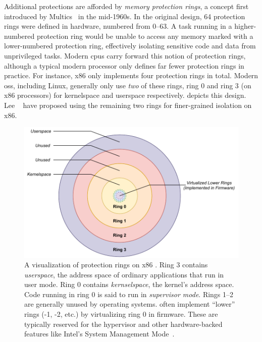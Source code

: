 Additional protections are afforded by \textit{memory protection rings}, a concept first
introduced by Multics~\cite{vyssotsky1965_multics, corbato1965_multics} in the mid-1960s.
In the original design, 64 protection rings were defined in hardware, numbered from 0--63.
A task running in a higher-numbered protection ring would be unable to access any memory
marked with a lower-numbered protection ring, effectively isolating sensitive code and
data from unprivileged tasks. Modern \glspl{cpu} carry forward this notion of protection
rings, although a typical modern processor only defines far fewer protection rings in
practice. For instance, x86 only implements four protection rings in total. Modern
\gls{os}s, including Linux, generally only use \textit{two} of these rings, ring 0 and
ring 3 (on x86 processors) for kernelspace and userspace respectively.  
depicts this design. Lee \etal~\cite{lee2018_lotr} have proposed using the remaining two
rings for finer-grained isolation on x86.

\begin{figure}[htbp]
  \centering
  \includegraphics[width=0.8\linewidth]{figs/background/rings.pdf}
  \caption[Protection rings on modern ]{
    A visualization of protection rings on x86 . Ring 3 contains
    \textit{userspace}, the address space of ordinary applications that run in user mode.
    Ring 0 contains \textit{kernselspace}, the kernel's address space. Code running in
    ring 0 is said to run in \textit{supervisor mode}. Rings 1--2 are generally unused by
     operating systems.  often implement \enquote{lower}
    rings (-1, -2, etc.) by virtualizing ring 0 in firmware. These are typically reserved
    for the hypervisor and other hardware-backed features like Intel's System Management
    Mode~\cite{tereshkin2009_introducing}.
  }%
  \label{fig:rings}
\end{figure}

